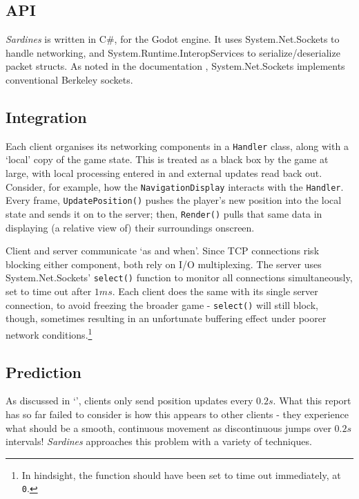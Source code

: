 \documentclass[a4paper, 9pt]{article}
\begin{document}
\begin{flushleft}
\subsection*{API}

\textit{Sardines} is written in C\#, for the Godot engine. It uses System.Net.Sockets to handle networking, and System.Runtime.InteropServices to serialize/deserialize packet structs. As noted in the documentation \citeyearpar{msftSNS}, System.Net.Sockets implements conventional Berkeley sockets.

\subsection*{Integration}

Each client organises its networking components in a \texttt{Handler} class, along with a `local' copy of the game state. This is treated as a black box by the game at large, with local processing entered in and external updates read back out. Consider, for example, how the \texttt{NavigationDisplay} interacts with the \texttt{Handler}. Every frame, \texttt{UpdatePosition()} pushes the player's new position into the local state and sends it on to the server; then, \texttt{Render()} pulls that same data in displaying (a relative view of) their surroundings onscreen.

\vspace{5pt}\noindent
Client and server communicate `as and when'. Since TCP connections risk blocking either component, both rely on I/O multiplexing. The server uses System.Net.Sockets' \texttt{select()} function to monitor all connections simultaneously, set to time out after $1ms$. Each client does the same with its single server connection, to avoid freezing the broader game - \texttt{select()} will still block, though, sometimes resulting in an unfortunate buffering effect under poorer network conditions.\footnote{In hindsight, the function should have been set to time out immediately, at \texttt{0}.}

\subsection*{Prediction}\label{Prediction}

As discussed in `',  clients only send position updates every $0.2s$. What this report has so far failed to consider is how this appears to other clients - they experience what should be a smooth, continuous movement as discontinuous jumps over $0.2s$ intervals! \textit{Sardines} approaches this problem with a variety of techniques.


\end{flushleft}
\end{document}
